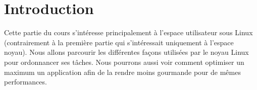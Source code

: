 
\chapter{Introduction} %

\label{Chapitre 1} %


Cette partie du cours s'intéresse principalement à l'espace utilisateur sous Linux (contrairement à la première partie qui s'intéressait uniquement à l'espace noyau). Nous allons parcourir les différentes façons utilisées par le noyau Linux pour ordonnancer ses tâches. Nous pourrons aussi voir comment optimiser un maximum un application afin de la rendre moins gourmande pour de mêmes performances. 



















